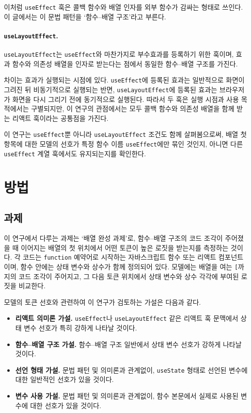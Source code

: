 \documentclass[11pt]{article}
\begin{document}
이처럼 \texttt{useEffect} 훅은 콜백 함수와 배열 인자를 외부 함수가 감싸는 형태로 쓰인다.
이 글에서는 이 문법 패턴을 `함수--배열 구조'라고 부른다.

\paragraph{\texttt{useLayoutEffect}.}
\texttt{useLayoutEffect}는 \texttt{useEffect}와 마찬가지로 부수효과를 등록하기 위한 훅이며, 효과 함수와 의존성 배열을 인자로 받는다는 점에서 동일한 함수--배열 구조를 가진다.

차이는 효과가 실행되는 시점에 있다.
\texttt{useEffect}에 등록된 효과는 일반적으로 화면이 그려진 뒤 비동기적으로 실행되는 반면, \texttt{useLayoutEffect}에 등록된 효과는 브라우저가 화면을 다시 그리기 전에 동기적으로 실행된다\citep{met2026lay}.
따라서 두 훅은 실행 시점과 사용 목적에서는 구별되지만, 이 연구의 관점에서는 모두 콜백 함수와 의존성 배열을 함께 받는 리액트 훅이라는 공통점을 가진다.

이 연구는 \texttt{useEffect}뿐 아니라 \texttt{useLayoutEffect} 조건도 함께 살펴봄으로써, 배열 첫 항목에 대한 모델의 선호가 특정 함수 이름 \texttt{useEffect}에만 묶인 것인지, 아니면 다른 \texttt{useEffect} 계열 훅에서도 유지되는지를 확인한다.

\section{방법}
\label{sec:method}
\subsection{과제}
\label{sec:method-task}

이 연구에서 다루는 과제는 `배열 완성 과제'로, 함수--배열 구조의 코드 조각이 주어졌을 때 이어지는 배열의 첫 위치에서 어떤 토큰이 높은 로짓을 받는지를 측정하는 것이다.
각 코드는 \texttt{function} 예약어로 시작하는 자바스크립트 함수 또는 리액트 컴포넌트이며, 함수 안에는 상태 변수와 상수가 함께 정의되어 있다.
모델에는 배열을 여는 \texttt{[}까지의 코드 조각이 주어지고, 그 다음 토큰 위치에서 상태 변수와 상수 각각에 부여된 로짓을 비교한다.

모델의 토큰 선호와 관련하여 이 연구가 검토하는 가설은 다음과 같다.

\begin{itemize}
  \item \textbf{리액트 의미론 가설.} \texttt{useEffect}나 \texttt{useLayoutEffect} 같은 리액트 훅 문맥에서 상태 변수 선호가 특히 강하게 나타날 것이다.
  \item \textbf{함수--배열 구조 가설.} 함수--배열 구조 일반에서 상태 변수 선호가 강하게 나타날 것이다.
  \item \textbf{선언 형태 가설.} 문법 패턴 및 의미론과 관계없이, \texttt{useState} 형태로 선언된 변수에 대한 일반적인 선호가 있을 것이다.
  \item \textbf{변수 사용 가설.} 문법 패턴 및 의미론과 관계없이, 함수 본문에서 실제로 사용된 변수에 대한 선호가 있을 것이다.
\end{itemize}
\end{document}

